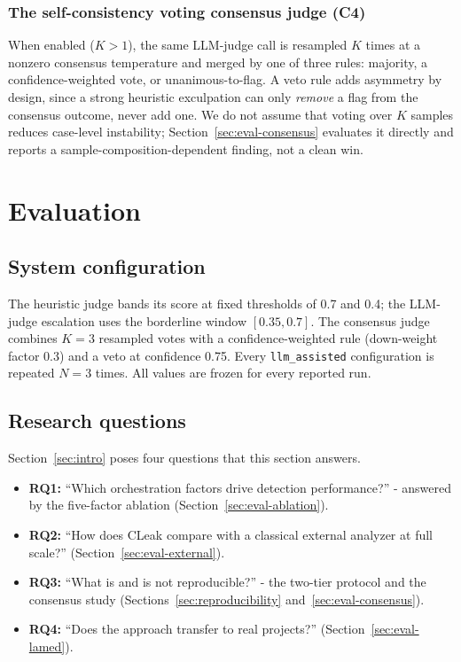 \documentclass[a4paper]{llncs}
\begin{document}
\subsubsection{The self-consistency voting consensus judge (C4)}

When enabled ($K>1$), the same LLM-judge call is resampled $K$ times at a
nonzero consensus temperature and merged by one of three rules: majority,
a confidence-weighted vote, or unanimous-to-flag. A veto rule
adds asymmetry by design, since a strong heuristic exculpation can only
\emph{remove} a flag from the consensus outcome, never add one. We do
not assume that voting over $K$ samples reduces case-level instability;
Section~\ref{sec:eval-consensus} evaluates it directly and
reports a sample-composition-dependent finding, not a clean win.

\section{Evaluation}
\label{sec:evaluation}

\subsection{System configuration}
The heuristic judge bands its
score at fixed thresholds of 0.7 and 0.4; the LLM-judge escalation uses
the borderline window $[0.35, 0.7]$. The consensus judge combines
$K{=}3$ resampled votes with a confidence-weighted rule (down-weight
factor 0.3) and a veto at confidence 0.75. Every
\texttt{llm\_assisted} configuration is repeated $N{=}3$ times. All
values are frozen for every reported run.

\subsection{Research questions}
\label{sec:eval-rq}
Section~\ref{sec:intro} poses four questions that this section answers.
\begin{itemize}
\item \textbf{RQ1:} ``Which orchestration factors drive detection performance?'' - answered by the five-factor ablation (Section~\ref{sec:eval-ablation}).
\item \textbf{RQ2:} ``How does CLeak compare with a classical external analyzer at full scale?'' (Section~\ref{sec:eval-external}).
\item \textbf{RQ3:} ``What is and is not reproducible?'' - the two-tier protocol and the consensus study (Sections~\ref{sec:reproducibility} and~\ref{sec:eval-consensus}).
\item \textbf{RQ4:} ``Does the approach transfer to real projects?'' (Section~\ref{sec:eval-lamed}).
\end{itemize}
\end{document}
